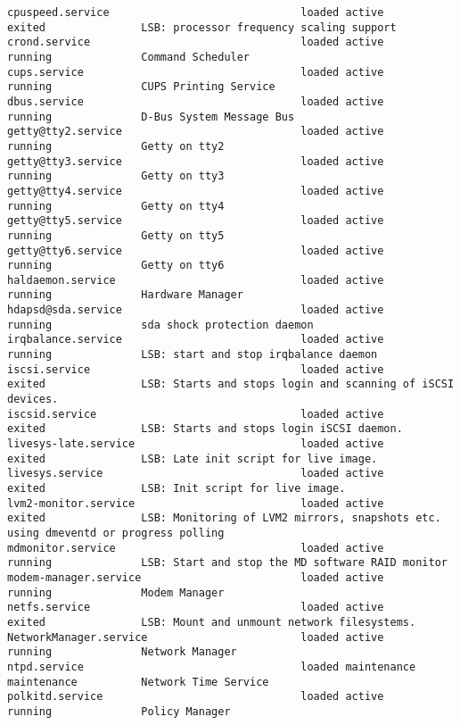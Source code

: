 \documentclass[10pt,oneside,a4paper]{article}
\begin{document}
\begin{landscape}
\begin{Verbatim}[fontsize=\small]
cpuspeed.service                              loaded active       exited               LSB: processor frequency scaling support
crond.service                                 loaded active       running              Command Scheduler
cups.service                                  loaded active       running              CUPS Printing Service
dbus.service                                  loaded active       running              D-Bus System Message Bus
getty@tty2.service                            loaded active       running              Getty on tty2
getty@tty3.service                            loaded active       running              Getty on tty3
getty@tty4.service                            loaded active       running              Getty on tty4
getty@tty5.service                            loaded active       running              Getty on tty5
getty@tty6.service                            loaded active       running              Getty on tty6
haldaemon.service                             loaded active       running              Hardware Manager
hdapsd@sda.service                            loaded active       running              sda shock protection daemon
irqbalance.service                            loaded active       running              LSB: start and stop irqbalance daemon
iscsi.service                                 loaded active       exited               LSB: Starts and stops login and scanning of iSCSI devices.
iscsid.service                                loaded active       exited               LSB: Starts and stops login iSCSI daemon.
livesys-late.service                          loaded active       exited               LSB: Late init script for live image.
livesys.service                               loaded active       exited               LSB: Init script for live image.
lvm2-monitor.service                          loaded active       exited               LSB: Monitoring of LVM2 mirrors, snapshots etc. using dmeventd or progress polling
mdmonitor.service                             loaded active       running              LSB: Start and stop the MD software RAID monitor
modem-manager.service                         loaded active       running              Modem Manager
netfs.service                                 loaded active       exited               LSB: Mount and unmount network filesystems.
NetworkManager.service                        loaded active       running              Network Manager
ntpd.service                                  loaded maintenance  maintenance          Network Time Service
polkitd.service                               loaded active       running              Policy Manager

\end{Verbatim}
\end{landscape}
\end{document}
